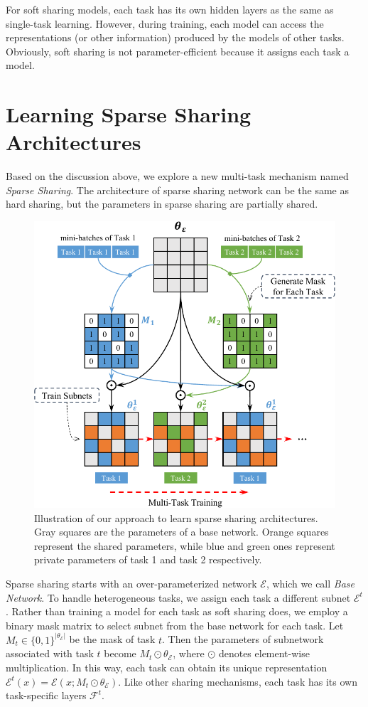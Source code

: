 \documentclass[letterpaper]{article} %
\begin{document}
For soft sharing models, each task has its own hidden layers as the same as single-task learning. However, during training, each model can access the representations (or other information) produced by the models of other tasks. Obviously, soft sharing is not parameter-efficient because it assigns each task a model.

\section{Learning Sparse Sharing Architectures}
Based on the discussion above, we explore a new multi-task mechanism named \emph{Sparse Sharing}. The architecture of sparse sharing network can be the same as hard sharing, but the parameters in sparse sharing are partially shared.

\begin{figure}[thb]
\centering
\includegraphics[width=\columnwidth]{3353_frame.pdf}
\caption{Illustration of our approach to learn sparse sharing architectures. Gray squares are the parameters of a base network. Orange squares represent the shared parameters, while blue and green ones represent private parameters of task 1 and task 2 respectively. }
\label{fig:frame}
\end{figure}

Sparse sharing starts with an over-parameterized network $\mathcal{E}$, which we call \emph{Base Network}. To handle heterogeneous tasks, we assign each task a different subnet $\mathcal{E}^t$.
Rather than training a model for each task as soft sharing does, we employ a binary mask matrix to select subnet from the base network for each task. Let $M_t\in\{0,1\}^{|\theta_\mathcal{E}|}$ be the mask of task $t$. Then the parameters of subnetwork associated with task $t$ become $M_t\odot \theta_\mathcal{E}$, where $\odot$ denotes element-wise multiplication. In this way, each task can obtain its unique representation $\mathcal{E}^t(x) = \mathcal{E}(x; M_t\odot \theta_\mathcal{E})$. Like other sharing mechanisms, each task has its own task-specific layers $\mathcal{F}^t$.
\end{document}
